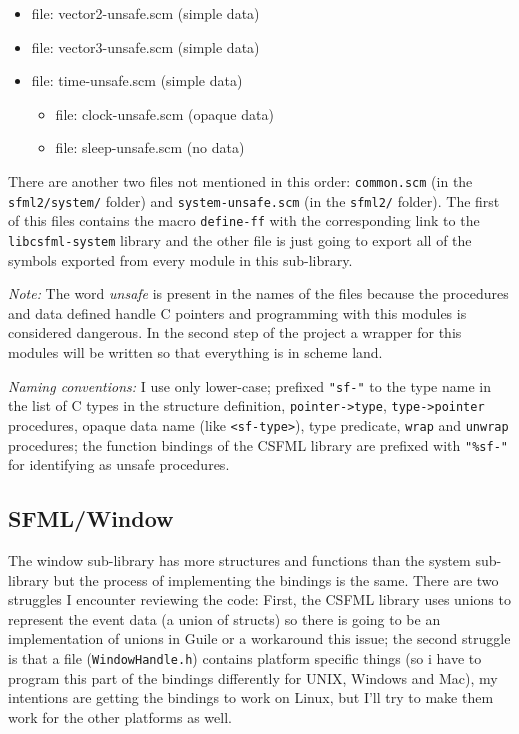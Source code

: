 \documentclass[latterpaper, leqno]{article}
\begin{document}
\begin{itemize}
  \item file: vector2-unsafe.scm (simple data)
  \item file: vector3-unsafe.scm (simple data)
  \item file: time-unsafe.scm (simple data)
    \begin{itemize}
      \item file: clock-unsafe.scm (opaque data)
      \item file: sleep-unsafe.scm (no data)
    \end{itemize}
\end{itemize}

There are another two files not mentioned in this order: \texttt{common.scm} (in the \texttt{sfml2/system/} folder) and \texttt{system-unsafe.scm} (in the \texttt{sfml2/} folder). The first of this files contains the macro \texttt{define-ff} with the corresponding link to the \texttt{libcsfml-system} library and the other file is just going to export all of the symbols exported from every module in this sub-library.

\bigskip

\emph{Note:} The word \emph{unsafe} is present in the names of the files because the procedures and data defined handle C pointers and programming with this modules is considered dangerous. In the second step of the project a wrapper for this modules will be written so that everything is in scheme land.

\bigskip

\emph{Naming conventions:} I use only lower-case; prefixed \texttt{"sf-"} to the type name in the list of C types in the structure definition, \texttt{pointer->type}, \texttt{type->pointer} procedures, opaque data name (like \texttt{<sf-type>}), type predicate, \texttt{wrap} and \texttt{unwrap} procedures; the function bindings of the CSFML library are prefixed with \texttt{"\%sf-"} for identifying as unsafe procedures.


\subsection{SFML/Window}

The window sub-library has more structures and functions than the system sub-library but the process of implementing the bindings is the same. There are two struggles I encounter reviewing the code: First, the CSFML library uses unions to represent the event data (a union of structs) so there is going to be an implementation of unions in Guile or a workaround this issue; the second struggle is that a file (\texttt{WindowHandle.h}) contains platform specific things (so i have to program this part of the bindings differently for UNIX, Windows and Mac), my intentions are getting the bindings to work on Linux, but I'll try to make them work for the other platforms as well.
\end{document}
